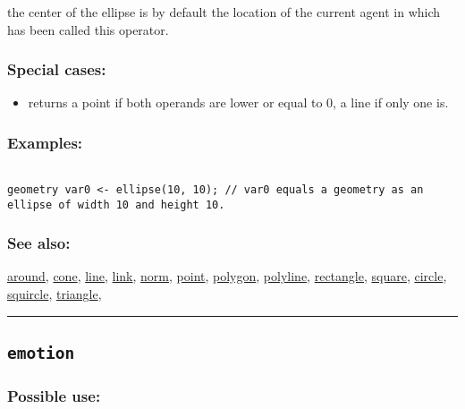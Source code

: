 \documentclass[]{book}
\providecommand{\tightlist}{%
  \setlength{\itemsep}{0pt}\setlength{\parskip}{0pt}}
\theoremstyle{definition}
\theoremstyle{definition}
\theoremstyle{definition}
\theoremstyle{remark}
\begin{document}
the center of the ellipse is by default the location of the current
agent in which has been called this operator.

\subsubsection{Special cases:}\label{special-cases-54}

\begin{itemize}
\tightlist
\item
  returns a point if both operands are lower or equal to 0, a line if
  only one is.
\end{itemize}

\subsubsection{Examples:}\label{examples-113}

\begin{verbatim}
 
geometry var0 <- ellipse(10, 10); // var0 equals a geometry as an ellipse of width 10 and height 10.
\end{verbatim}

\subsubsection{See also:}\label{see-also-87}

\href{OperatorsAA\#around}{around}, \href{OperatorsBC\#cone}{cone},
\href{OperatorsIM\#line}{line}, \href{OperatorsIM\#link}{link},
\href{OperatorsNR\#norm}{norm}, \href{OperatorsNR\#point}{point},
\href{OperatorsNR\#polygon}{polygon},
\href{OperatorsNR\#polyline}{polyline},
\href{OperatorsNR\#rectangle}{rectangle},
\href{OperatorsSZ\#square}{square}, \href{OperatorsBC\#circle}{circle},
\href{OperatorsSZ\#squircle}{squircle},
\href{OperatorsSZ\#triangle}{triangle},

\begin{center}\rule{0.5\linewidth}{\linethickness}\end{center}

\subsection{\texorpdfstring{\texttt{emotion}}{emotion}}\label{emotion}

\subsubsection{Possible use:}\label{possible-use-151}
\end{document}
